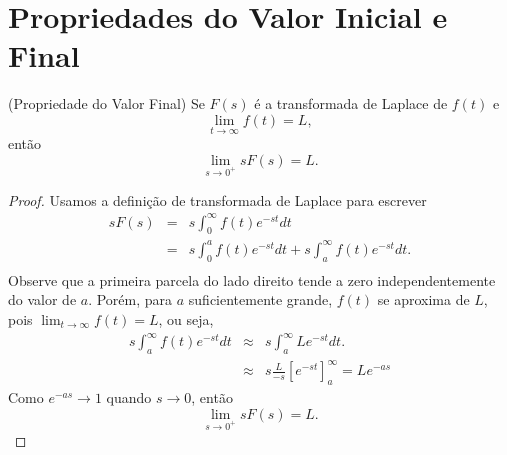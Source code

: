 \documentclass[Main.tex]{subfiles}
\begin{document}
\section{Propriedades do Valor Inicial e Final}
\begin{propr}(Propriedade do Valor Final) Se $F(s)$ é a transformada de Laplace de $f(t)$ e 
$$
\lim_{t\to\infty}f(t)=L,
$$
então
$$
\lim_{s\to 0^+} sF(s)=L.
$$
\end{propr}
\begin{proof}Usamos a definição de transformada de Laplace para escrever
\begin{eqnarray*}
sF(s)&=&s\int_0^\infty f(t)e^{-st}dt\\
&=&s\int_0^a f(t)e^{-st}dt+s\int_a^\infty f(t)e^{-st}dt.\\
\end{eqnarray*}
Observe que a primeira parcela do lado direito tende a zero independentemente do valor de $a$. Porém, para $a$ suficientemente grande, $f(t)$ se aproxima de $L$, pois $\displaystyle \lim_{t\to\infty}f(t)=L$, ou seja,
\begin{eqnarray*}
s\int_a^\infty f(t)e^{-st}dt &\approx &s\int_a^\infty L e^{-st}dt.\\
&\approx &s\frac{L}{-s}\left[ e^{-st}\right]_a^\infty=Le^{-as}
\end{eqnarray*}
Como $e^{-as}\to 1$ quando $s\to 0$, então
$$
\lim_{s\to 0^+} sF(s)=L.
$$ 
\end{proof}
\end{document}
